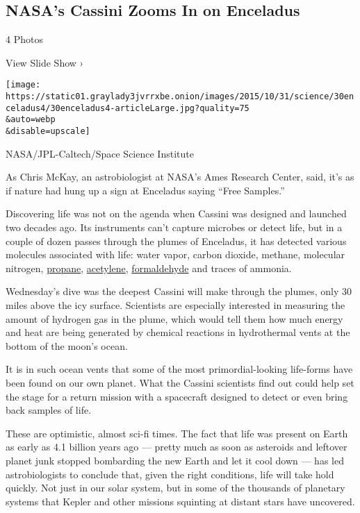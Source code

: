 \href{https://www.nytimes3xbfgragh.onion/slideshow/2015/10/30/science/space/nasas-cassini-zooms-in-on-enceladus.html}{}

\hypertarget{nasas-cassini-zooms-in-on-enceladus}{%
\subsection{NASA's Cassini Zooms In on
Enceladus}\label{nasas-cassini-zooms-in-on-enceladus}}

4 Photos

View Slide Show ›

\texttt{[image: https://static01.graylady3jvrrxbe.onion/images/2015/10/31/science/30enceladus4/30enceladus4-articleLarge.jpg?quality=75\\\&auto=webp\\\&disable=upscale]}

NASA/JPL-Caltech/Space Science Institute

As Chris McKay, an astrobiologist at NASA's Ames Research Center, said,
it's as if nature had hung up a sign at Enceladus saying ``Free
Samples.''

Discovering life was not on the agenda when Cassini was designed and
launched two decades ago. Its instruments can't capture microbes or
detect life, but in a couple of dozen passes through the plumes of
Enceladus, it has detected various molecules associated with life: water
vapor, carbon dioxide, methane, molecular nitrogen,
\href{https://en.wikipedia.org/wiki/Propane}{propane},
\href{https://en.wikipedia.org/wiki/Acetylene}{acetylene},
\href{https://en.wikipedia.org/wiki/Formaldehyde}{formaldehyde} and
traces of ammonia.

Wednesday's dive was the deepest Cassini will make through the plumes,
only 30 miles above the icy surface. Scientists are especially
interested in measuring the amount of hydrogen gas in the plume, which
would tell them how much energy and heat are being generated by chemical
reactions in hydrothermal vents at the bottom of the moon's ocean.

It is in such ocean vents that some of the most primordial-looking
life-forms have been found on our own planet. What the Cassini
scientists find out could help set the stage for a return mission with a
spacecraft designed to detect or even bring back samples of life.

These are optimistic, almost sci-fi times. The fact that life was
present on Earth as early as 4.1 billion years ago --- pretty much as
soon as asteroids and leftover planet junk stopped bombarding the new
Earth and let it cool down --- has led astrobiologists to conclude that,
given the right conditions, life will take hold quickly. Not just in our
solar system, but in some of the thousands of planetary systems that
Kepler and other missions squinting at distant stars have uncovered.

